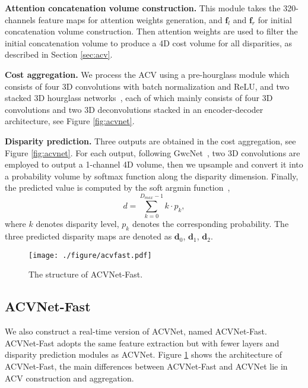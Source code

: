 \documentclass[10pt,twocolumn,letterpaper]{article}
\begin{document}
\textbf{Attention concatenation volume construction.} This module takes the 320-channels feature maps for attention weights generation, and $\mathbf{f}_l$ and $\mathbf{f}_r$ for initial concatenation volume construction. Then attention weights are used to filter the initial concatenation volume to produce a 4D cost volume for all disparities, as described in Section \ref{sec:acv}.

\textbf{Cost aggregation.} We process the ACV using a pre-hourglass module which consists of four 3D convolutions with batch normalization and ReLU, and two stacked 3D hourglass networks~\cite{guo2019group}, each of which mainly consists of four 3D convolutions and two 3D deconvolutions stacked in an encoder-decoder architecture, see Figure \ref{fig:acvnet}. 


\textbf{Disparity prediction.} Three outputs are obtained in the cost aggregation, see Figure \ref{fig:acvnet}. For each output, following GwcNet~\cite{guo2019group}, two 3D convolutions are employed to output a 1-channel 4D volume, then we upsample and convert it into a probability volume by softmax function along the disparity dimension. Finally, the predicted value is computed by the soft argmin function~\cite{kendall2017end},
\begin{equation}
d=\sum\limits_{k=0}^{D_{max}-1}k\cdot{p_{k}},
\label{equ:soft-argmin}
\end{equation}
where $k$ denotes disparity level, $p_k$ denotes the corresponding probability. The three predicted disparity maps are denoted as $\mathbf{d}_0$, $\mathbf{d}_1$, $\mathbf{d}_2$.

\begin{figure}
\centering
{\texttt{[image: ./figure/acvfast.pdf]}}
\caption{
The structure of ACVNet-Fast.}\label{fig:acv_fast}
\vspace{-10pt}
\end{figure}

\subsection{ACVNet-Fast} \label{sec:acv_fast}
We also construct a real-time version of ACVNet, named ACVNet-Fast. 
ACVNet-Fast adopts the same feature extraction but with fewer layers and disparity prediction modules as ACVNet. Figure \ref{fig:acv_fast} shows the architecture of ACVNet-Fast, the main differences between ACVNet-Fast and ACVNet lie in ACV construction and aggregation. 
\end{document}
